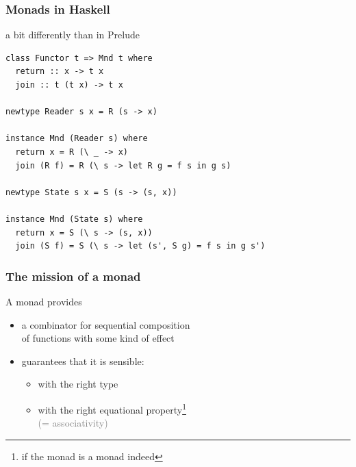 \documentclass[aspectratio=169,11pt]{beamer}
\newcommand{\gray}[1]{\textcolor{gray}{#1}}
\begin{document}
\begin{frame}[fragile]

\frametitle{Monads in Haskell}

{\scriptsize a bit differently than in Prelude}

\scriptsize
\begin{verbatim}
class Functor t => Mnd t where
  return :: x -> t x
  join :: t (t x) -> t x

newtype Reader s x = R (s -> x)

instance Mnd (Reader s) where
  return x = R (\ _ -> x)
  join (R f) = R (\ s -> let R g = f s in g s)  

newtype State s x = S (s -> (s, x))

instance Mnd (State s) where
  return x = S (\ s -> (s, x))
  join (S f) = S (\ s -> let (s', S g) = f s in g s')    
\end{verbatim}

\end{frame}

\begin{frame}

\frametitle{The mission of a monad}
  
  A monad 
  provides

  \begin{itemize}
    
  \item a combinator for sequential composition \\
  of functions with some kind of effect

  \item guarantees that it is sensible:

  \begin{itemize}

  \item with the right type

  \item with the right equational property\footnote{if the monad is a monad indeed} \\
    \gray{(= associativity)}

  \end{itemize}

  \end{itemize}
  
\end{frame}



\end{document}
